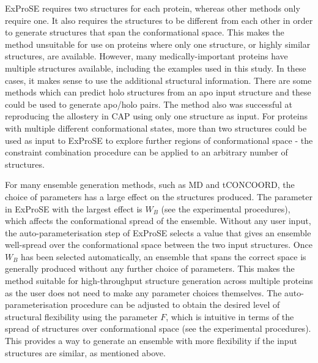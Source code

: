 ExProSE requires two structures for each protein, whereas other methods only require one.
It also requires the structures to be different from each other in order to generate structures that span the conformational space.
This makes the method unsuitable for use on proteins where only one structure, or highly similar structures, are available.
However, many medically-important proteins have multiple structures available, including the examples used in this study.
In these cases, it makes sense to use the additional structural information.
There are some methods which can predict holo structures from an apo input structure \cite{Seeliger2010, Grove2013} and these could be used to generate apo/holo pairs.
The method also was successful at reproducing the allostery in CAP using only one structure as input.
For proteins with multiple different conformational states, more than two structures could be used as input to ExProSE to explore further regions of conformational space - the constraint combination procedure can be applied to an arbitrary number of structures.

For many ensemble generation methods, such as MD and tCONCOORD, the choice of parameters has a large effect on the structures produced.
The parameter in ExProSE with the largest effect is $W_{B}$ (see the experimental procedures), which affects the conformational spread of the ensemble.
Without any user input, the auto-parameterisation step of ExProSE selects a value that gives an ensemble well-spread over the conformational space between the two input structures.
Once $W_{B}$ has been selected automatically, an ensemble that spans the correct space is generally produced without any further choice of parameters.
This makes the method suitable for high-throughput structure generation across multiple proteins as the user does not need to make any parameter choices themselves.
The auto-parameterisation procedure can be adjusted to obtain the desired level of structural flexibility using the parameter $F$, which is intuitive in terms of the spread of structures over conformational space (see the experimental procedures).
This provides a way to generate an ensemble with more flexibility if the input structures are similar, as mentioned above.

